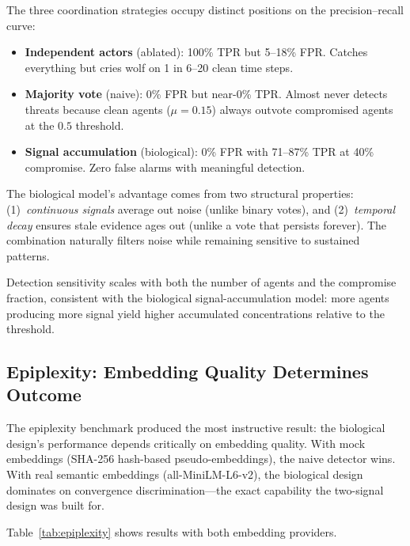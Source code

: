The three coordination strategies occupy distinct positions on the
precision--recall curve:

\begin{itemize}[nosep]
  \item \textbf{Independent actors} (ablated): 100\% TPR but 5--18\% FPR.
        Catches everything but cries wolf on 1 in 6--20 clean time steps.
  \item \textbf{Majority vote} (naive): 0\% FPR but near-0\% TPR.
        Almost never detects threats because clean agents ($\mu = 0.15$)
        always outvote compromised agents at the $0.5$ threshold.
  \item \textbf{Signal accumulation} (biological): 0\% FPR with
        71--87\% TPR at 40\% compromise.  Zero false alarms with
        meaningful detection.
\end{itemize}

The biological model's advantage comes from two structural properties:
(1)~\emph{continuous signals} average out noise (unlike binary votes),
and (2)~\emph{temporal decay} ensures stale evidence ages out (unlike
a vote that persists forever).  The combination naturally filters noise
while remaining sensitive to sustained patterns.

Detection sensitivity scales with both the number of agents and the
compromise fraction, consistent with the biological signal-accumulation
model: more agents producing more signal yield higher accumulated
concentrations relative to the threshold.

\subsection{Epiplexity: Embedding Quality Determines Outcome}

The epiplexity benchmark produced the most instructive result: the
biological design's performance depends critically on embedding quality.
With mock embeddings (SHA-256 hash-based pseudo-embeddings), the naive
detector wins.  With real semantic embeddings (all-MiniLM-L6-v2), the
biological design dominates on convergence discrimination---the exact
capability the two-signal design was built for.

Table~\ref{tab:epiplexity} shows results with both embedding providers.

